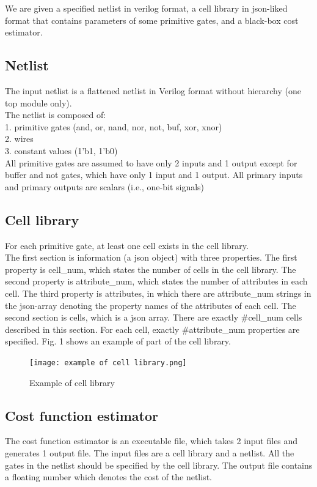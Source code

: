 \documentclass[conference]{IEEEtran}
\begin{document}
We are given a specified netlist in verilog format, a cell library in json-liked format that contains parameters of some primitive gates, and a black-box cost estimator.

\subsection{Netlist}

The input netlist is a flattened netlist in Verilog format without hierarchy (one top module only).\\
The netlist is composed of:\\
1. primitive gates (and, or, nand, nor, not, buf, xor, xnor)\\
2. wires\\
3. constant values (1’b1, 1’b0)\\
All primitive gates are assumed to have only 2 inputs and 1 output
except for buffer and not gates, which have only 1 input and 1 output.
All primary inputs and primary outputs are scalars (i.e., one-bit signals)\\

\subsection{Cell library}

For each primitive gate, at least one cell exists in the cell library.\\
The first section is information (a json object) with three properties. The first property is cell\_num, which states the number of cells in the cell library. The second property is attribute\_num, which states the number of attributes in each cell. The third property is attributes, in which there are
attribute\_num strings in the json-array denoting the property names of the
attributes of each cell.
The second section is cells, which is a json array. There are exactly
\#cell\_num cells described in this section. For each cell, exactly
\#attribute\_num properties are specified. Fig. 1 shows an example of part of the cell library.
\begin{figure}
    \centering
    \texttt{[image: example of cell library.png]}
    \caption{Example of cell library}
    \label{fig:enter-label}
\end{figure}

\subsection{Cost function estimator}
The cost function estimator is an executable file, which takes 2 input files and generates 1 output file. The input files are a cell library and a netlist. All the gates in the netlist should be specified by the cell library. The output file contains a floating number which denotes the cost of the netlist.
\end{document}
